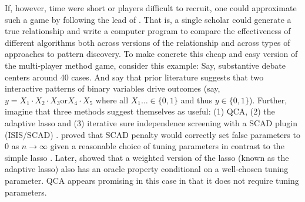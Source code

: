 \documentclass[12pt]{article}
\begin{document}
If, however, time were short or players difficult to recruit, one could
approximate such a game by following the lead of \citet{lucasfk2013}. That is,
a single scholar could generate a true relationship and write a computer
program to compare the effectiveness of different algorithms both across
versions of the relationship and across types of approaches to pattern
discovery. To make concrete this cheap and easy version of the multi-player
method game, consider this example: Say, substantive debate centers around 40
cases. And say that prior literature suggests that two interactive patterns of
binary variables drive outcomes (say, $y=X_1 \cdot X_2 \cdot X_3 \text{or} X_4
\cdot X_5$ where all $X_1 \ldots  \in \{0,1\}$ and thus $y \in \{0,1\}$).
Further, imagine that three methods suggest themselves as useful: (1) QCA, (2)
the adaptive lasso and (3) iterative sure independence screening with a SCAD
plugin (ISIS/SCAD) \cite{fan2008sure}.  \cite{fan2001variable} proved that
SCAD penalty would correctly set false parameters to 0 as $n \rightarrow
\infty$ given a reasonable choice of tuning parameters in contrast to the
simple lasso \cite{tibshirani1996regression}.  Later, \citet{zou2006adaptive}
showed that a weighted version of the lasso (known as the adaptive lasso) also
has an oracle property conditional on a well-chosen tuning parameter. QCA
appears promising in this case in that it does not require tuning parameters.
\end{document}

